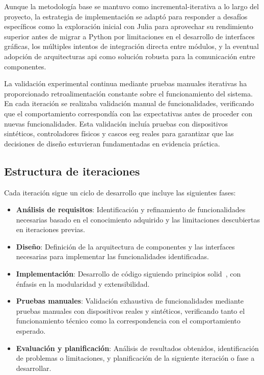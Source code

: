 Aunque la metodología base se mantuvo como incremental-iterativa a lo largo del proyecto, la estrategia de implementación se adaptó para responder a desafíos específicos como la exploración inicial con Julia para aprovechar su rendimiento superior antes de migrar a Python por limitaciones en el desarrollo de interfaces gráficas, los múltiples intentos de integración directa entre módulos, y la eventual adopción de arquitecturas \acrshort{api} como solución robusta para la comunicación entre componentes.

La validación experimental continua mediante pruebas manuales iterativas ha proporcionado retroalimentación constante sobre el funcionamiento del sistema. En cada iteración se realizaba validación manual de funcionalidades, verificando que el comportamiento correspondía con las expectativas antes de proceder con nuevas funcionalidades. Esta validación incluía pruebas con dispositivos sintéticos, controladores físicos y cascos \acrshort{eeg} reales para garantizar que las decisiones de diseño estuvieran fundamentadas en evidencia práctica.

\subsection{Estructura de iteraciones}
\label{subsec:estructura_iteraciones}

Cada iteración sigue un ciclo de desarrollo que incluye las siguientes fases:

\begin{itemize}
    \item \textbf{Análisis de requisitos}: Identificación y refinamiento de funcionalidades necesarias basado en el conocimiento adquirido y las limitaciones descubiertas en iteraciones previas.
    \item \textbf{Diseño}: Definición de la arquitectura de componentes y las interfaces necesarias para implementar las funcionalidades identificadas.
    \item \textbf{Implementación}: Desarrollo de código siguiendo principios \acrshort{solid}~\cite{martin2003agile}, con énfasis en la modularidad y extensibilidad.
    \item \textbf{Pruebas manuales}: Validación exhaustiva de funcionalidades mediante pruebas manuales con dispositivos reales y sintéticos, verificando tanto el funcionamiento técnico como la correspondencia con el comportamiento esperado.
    \item \textbf{Evaluación y planificación}: Análisis de resultados obtenidos, identificación de problemas o limitaciones, y planificación de la siguiente iteración o fase a desarrollar.
\end{itemize}

